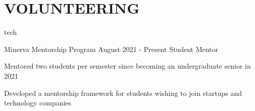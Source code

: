 \section{VOLUNTEERING}
\begin{rolecontent}{tech}
\begin{experience}
                   {Minerva Mentorship Program}
                   {August 2021 - Present}
                   {Student Mentor}
    \item Mentored two students per semester since becoming an undergraduate senior in 2021
    \item Developed a mentorship framework for students wishing to join startups and technology companies
\end{experience}
\end{rolecontent}